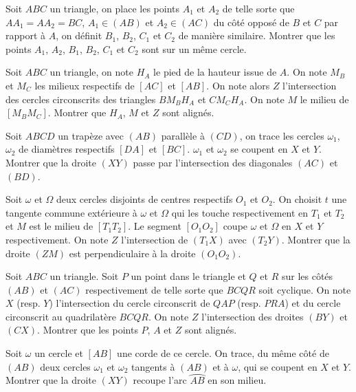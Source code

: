 \begin{exo}
Soit $ABC$ un triangle, on place les points $A_1$ et $A_2$ de telle sorte que $AA_1=AA_2=BC$, $A_1 \in (AB)$ et $A_2 \in (AC)$ du côté opposé de $B$ et $C$ par rapport à $A$, on définit $B_1$, $B_2$, $C_1$ et $C_2$ de manière similaire. Montrer que les points $A_1$, $A_2$, $B_1$, $B_2$, $C_1$ et $C_2$ sont sur un même cercle.
\end{exo}

\begin{exo}
Soit $ABC$ un triangle, on note $H_A$ le pied de la hauteur issue de $A$. On note $M_B$ et $M_C$ les milieux respectifs de $[AC]$ et $[AB]$. On note alors $Z$ l'intersection des cercles circonscrits des triangles $BM_BH_A$ et $CM_CH_A$. On note $M$ le milieu de $[M_BM_C]$. Montrer que $H_A$, $M$ et $Z$ sont alignés.
\end{exo}

\begin{exo}
Soit $ABCD$ un trapèze avec $(AB)$ parallèle à $(CD)$, on trace les cercles $\omega_1$, $\omega_2$ de diamètres respectifs $[DA]$ et $[BC]$. $\omega_1$ et $\omega_2$ se coupent en $X$ et $Y$. Montrer que la droite $(XY)$ passe par l'intersection des diagonales $(AC)$ et $(BD)$.
\end{exo}

\begin{exo}
Soit $\omega$ et $\Omega$ deux cercles disjoints de centres respectifs $O_1$ et $O_2$. On choisit $t$ une tangente commune extérieure à $\omega$ et $\Omega$ qui les touche respectivement en $T_1$ et $T_2$ et $M$ est le milieu de $[T_1T_2]$. Le segment $[O_1O_2]$ coupe $\omega$ et $\Omega$ en $X$ et $Y$ respectivement. On note $Z$ l'intersection de $(T_1X)$ avec $(T_2Y)$. Montrer que la droite $(ZM)$ est perpendiculaire à la droite $(O_1O_2)$.
\end{exo}

\begin{exo}
Soit $ABC$ un triangle. Soit $P$ un point dans le triangle et $Q$ et $R$ sur les côtés $(AB)$ et $(AC)$ respectivement de telle sorte que $BCQR$ soit cyclique. On note $X$ (resp. $Y$) l'intersection du cercle circonscrit de $QAP$ (resp. $PRA$) et du cercle circonscrit au quadrilatère $BCQR$. On note $Z$ l'intersection des droites $(BY)$ et $(CX)$. Montrer que les points $P$, $A$ et $Z$ sont alignés.
\end{exo}

\begin{exo}
Soit $\omega$ un cercle et $[AB]$ une corde de ce cercle. On trace, du même côté de $(AB)$ deux cercles $\omega_1$ et $\omega_2$ tangents à $(AB)$ et à $\omega$, qui se coupent en $X$ et $Y$. Montrer que la droite $(XY)$ recoupe l'arc $\wideparen{AB}$ en son milieu.
\end{exo}



